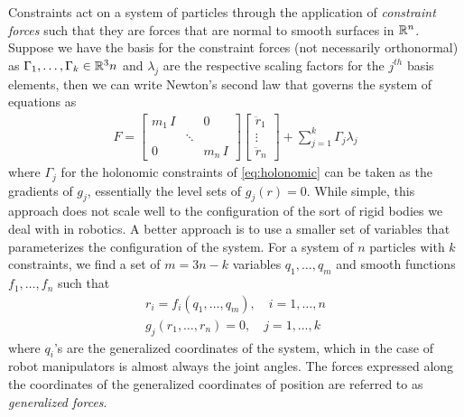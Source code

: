 Constraints act on a system of particles through the application of \textit{constraint forces} such that they are forces that are normal to smooth surfaces in $\mathbb{R}^n$. Suppose we have the basis for the constraint forces (not necessarily orthonormal) as $\Gamma_1, \ldots, \Gamma_k \in \mathbb{R}^3n$ and $\lambda_j$ are the respective scaling factors for the $j^{th}$ basis elements, then we can write Newton's second law that governs the system of equations as 
%
\begin{align}
	F = \begin{bmatrix}
	m_1 \, I &  & 0 \\
	& \ddots & \\
	0 & & m_n \, I
	\end{bmatrix}
	\begin{bmatrix}
	\ddot{r}_1  \\ \vdots \\ \ddot{r}_n
	\end{bmatrix} +  \sum_{j=1}^{k} \Gamma_j \lambda_j
\end{align}
%
where $\Gamma_j$ for the holonomic constraints of \eqref{eq:holonomic} can be taken as the gradients of $g_j$, essentially the level sets of $g_j(r) = 0$. 
%
While simple, this approach does not scale well to the configuration of the sort of rigid bodies we deal with in robotics. A better approach is to use a smaller set of variables that parameterizes the configuration of the system. For a system of $n$ particles with $k$ constraints, we find a set of $m = 3n − k$ variables $q_1, \ldots , q_m$ and smooth functions $f_1, \ldots, f_n$ such that 
%
\begin{align}
	r_i = f_i(q_1, \ldots, q_m), \quad i = 1, \ldots, n \\
	g_j(r_1, \ldots, r_n) = 0, \quad j = 1, \ldots, k
\end{align}
%
where $q_i$'s are the generalized coordinates of the system, which in the case of robot manipulators is almost always the joint angles.  The forces expressed along the coordinates of the generalized coordinates of position are referred to as \textit{generalized forces}. 


